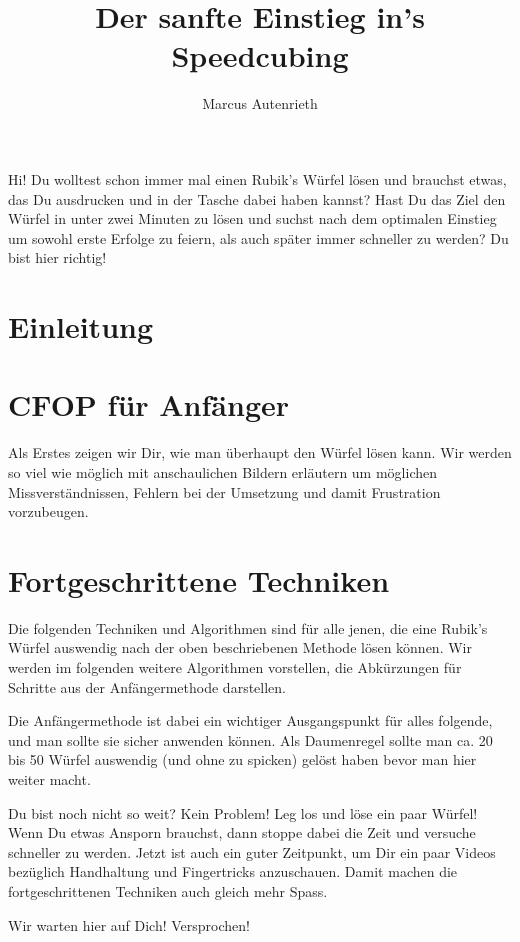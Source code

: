 \documentclass[11pt, a5paper]{scrbook}
\title{Der sanfte Einstieg in's Speedcubing}
\author{Marcus Autenrieth}
\begin{document}
\maketitle

Hi! Du wolltest schon immer mal einen Rubik's Würfel lösen und brauchst etwas, das Du ausdrucken und in der Tasche dabei haben kannst?
Hast Du das Ziel den Würfel in unter zwei Minuten zu lösen und suchst nach dem optimalen Einstieg um sowohl erste Erfolge zu feiern, als auch später immer schneller zu werden?
Du bist hier richtig!

\tableofcontents

\chapter{Einleitung}


\chapter{CFOP für Anfänger}
Als Erstes zeigen wir Dir, wie man überhaupt den Würfel lösen kann. Wir werden so viel wie möglich mit anschaulichen Bildern erläutern um möglichen Missverständnissen, Fehlern bei der Umsetzung und damit Frustration vorzubeugen.












\chapter{Fortgeschrittene Techniken}
Die folgenden Techniken und Algorithmen sind für alle jenen, die eine Rubik's Würfel auswendig nach der
oben beschriebenen Methode lösen können. Wir werden im folgenden weitere Algorithmen vorstellen,
die Abkürzungen für Schritte aus der Anfängermethode darstellen.

Die Anfängermethode ist dabei ein wichtiger Ausgangspunkt für alles folgende,
und man sollte sie sicher anwenden können. Als Daumenregel sollte man ca. 20
bis 50 Würfel auswendig (und ohne zu spicken) gelöst haben bevor man hier weiter macht.

Du bist noch nicht so weit? Kein Problem! Leg los und löse ein paar Würfel! Wenn
Du etwas Ansporn brauchst, dann stoppe dabei die Zeit und versuche schneller zu werden.
Jetzt ist auch ein guter Zeitpunkt, um Dir ein paar Videos bezüglich Handhaltung und
Fingertricks anzuschauen. Damit machen die fortgeschrittenen Techniken auch gleich mehr Spass.

Wir warten hier auf Dich! Versprochen!
\pagebreak




%
%
%
%
%
\end{document}
